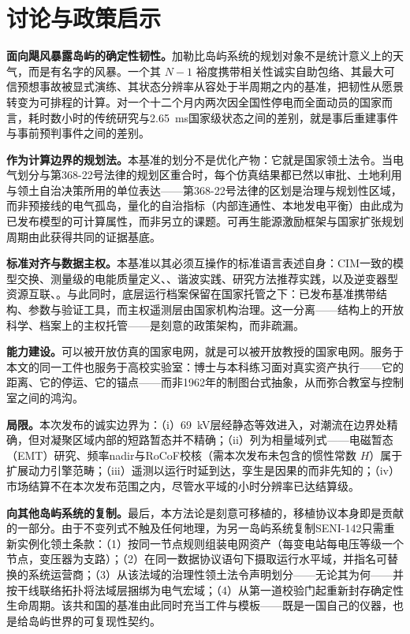 \section{讨论与政策启示}
\label{sec:discussion}

\textbf{面向飓风暴露岛屿的确定性韧性。}加勒比岛屿系统的规划对象不是统计意义上的天气，而是有名字的风暴。一个其 $N-1$ 裕度携带相关性诚实自助包络、其最大可信预想事故被显式演练、其状态分辨率从容处于半周期之内的基准，把韧性从愿景转变为可排程的计算。对一个十二个月内两次因全国性停电而全面动员的国家\cite{ocseni}而言，耗时数小时的传统研究与2.65~ms国家级状态之间的差别，就是事后重建事件与事前预判事件之间的差别。

\textbf{作为计算边界的规划法。}本基准的划分不是优化产物：它就是国家领土法令\cite{ley368}。当电气划分与第368-22号法律的规划区重合时，每个仿真结果都已然以审批、土地利用与领土自治决策所用的单位表达——第368-22号法律的区划是治理与规划性区域，而非预接线的电气孤岛，量化的自治指标（内部连通性、本地发电平衡）由此成为已发布模型的可计算属性，而非另立的课题。可再生能源激励框架\cite{ley57}与国家扩张规划周期\cite{cne2022}由此获得共同的证据基底。

\textbf{标准对齐与数据主权。}本基准以其必须互操作的标准语言表述自身：CIM一致的模型交换\cite{iec61970}、测量级的电能质量定义\cite{iec61000}、\cite{ieee1459}、谐波实践\cite{ieee519}、研究方法推荐实践\cite{ieee399}，以及逆变器型资源互联\cite{ieee2800}、\cite{ieee1547}。与此同时，底层运行档案保留在国家托管之下：已发布基准携带结构、参数与验证工具，而主权遥测层由国家机构治理。这一分离——结构上的开放科学、档案上的主权托管——是刻意的政策架构，而非疏漏。

\textbf{能力建设。}可以被开放仿真的国家电网，就是可以被开放教授的国家电网。服务于本文的同一工件也服务于高校实验室：博士与本科练习面对真实资产执行——它的距离、它的停运、它的锚点——而非1962年的制图台式抽象，从而弥合教室与控制室之间的鸿沟。

\textbf{局限。}本次发布的诚实边界为：（i）69~kV层经静态等效进入，对潮流在边界处精确，但对凝聚区域内部的短路暂态并不精确；（ii）列为相量域列式——电磁暂态（EMT）研究、频率nadir与RoCoF校核（需本次发布未包含的惯性常数 $H$）属于扩展动力引擎范畴；（iii）遥测以运行时延到达，孪生是因果的而非先知的；（iv）市场结算不在本次发布范围之内，尽管水平域的小时分辨率已达结算级。

\textbf{向其他岛屿系统的复制。}最后，本方法论是刻意可移植的，移植协议本身即是贡献的一部分。由于不变列式不触及任何地理，为另一岛屿系统复制SENI-142只需重新实例化领土条款：（1）按同一节点规则组装电网资产（每变电站每电压等级一个节点，变压器为支路）；（2）在同一数据协议语句下摄取运行水平域，并指名可替换的系统运营商；（3）从该法域的治理性领土法令声明划分——无论其为何——并按干线联络拓扑将法域层捆绑为电气宏域；（4）从第一道校验门起重新封存确定性生命周期。该共和国的基准由此同时充当工件与模板——既是一国自己的仪器，也是给岛屿世界的可复现性契约。
